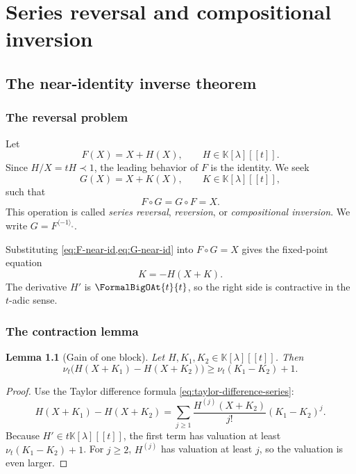 \documentclass[11pt,openany]{book}
\theoremstyle{definition}
\theoremstyle{plain}
\newtheorem{lemma}{Lemma}[chapter]
\theoremstyle{remark}
\newcommand{\K}{\mathbb{K}}
\newcommand{\precdom}{\prec}
\newcommand{\invcomp}{^{\langle -1\rangle_{\circ}}}
\newcommand{\val}{\nu}
\begin{document}
\part{Series reversal and compositional inversion}\label{part:reversion}

\chapter{The near-identity inverse theorem}\label{ch:inverse-theorem}

\section{The reversal problem}
Let
\begin{equation}\label{eq:F-near-id}
 F(X)=X+H(X),
 \qquad H\in\K[\lambda][[t]].
\end{equation}
Since \(H/X=tH\precdom1\), the leading behavior of \(F\) is the identity. We seek
\begin{equation}\label{eq:G-near-id}
 G(X)=X+K(X),
 \qquad K\in\K[\lambda][[t]],
\end{equation}
such that
\begin{equation}\label{eq:two-sided-inverse}
 F\circ G=G\circ F=X.
\end{equation}
This operation is called \emph{series reversal}, \emph{reversion}, or \emph{compositional inversion}. We write \(G=F\invcomp\).

Substituting \cref{eq:F-near-id,eq:G-near-id} into \(F\circ G=X\) gives the fixed-point equation
\begin{equation}\label{eq:inverse-fixed-point}
 K=-H(X+K).
\end{equation}
The derivative \(H'\) is \(\FormalBigOAt{t}{t}\), so the right side is contractive in the \(t\)-adic sense.

\section{The contraction lemma}
\begin{lemma}[Gain of one block]\label{lem:inverse-contraction}
Let \(H,K_1,K_2\in\K[\lambda][[t]]\). Then
\begin{equation}\label{eq:gain-one-H}
 \val_t\bigl(H(X+K_1)-H(X+K_2)\bigr)
 \ge \val_t(K_1-K_2)+1.
\end{equation}
\end{lemma}

\begin{proof}
Use the Taylor difference formula \cref{eq:taylor-difference-series}:
\[
 H(X+K_1)-H(X+K_2)
 =\sum_{j\ge1}\frac{H^{(j)}(X+K_2)}{j!}(K_1-K_2)^j.
\]
Because \(H'\in t\K[\lambda][[t]]\), the first term has valuation at least \(\val_t(K_1-K_2)+1\). For \(j\ge2\), \(H^{(j)}\) has valuation at least \(j\), so the valuation is even larger.
\end{proof}
\end{document}
